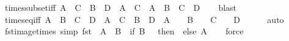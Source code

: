 \begin{isabellebody}
\isamarkupfalse%
\ times{\isacharunderscore}{\kern0pt}subset{\isacharunderscore}{\kern0pt}iff{\isacharcolon}{\kern0pt}\ {\isachardoublequoteopen}A\ {\isasymtimes}\ C\ {\isasymsubseteq}\ B\ {\isasymtimes}\ D\ {\isasymlongleftrightarrow}\ A{\isacharequal}{\kern0pt}{\isacharbraceleft}{\kern0pt}{\isacharbraceright}{\kern0pt}\ {\isasymor}\ C{\isacharequal}{\kern0pt}{\isacharbraceleft}{\kern0pt}{\isacharbraceright}{\kern0pt}\ {\isasymor}\ A\ {\isasymsubseteq}\ B\ {\isasymand}\ C\ {\isasymsubseteq}\ D{\isachardoublequoteclose}\isanewline
%
\isadelimproof
\ \ %
\endisadelimproof
%
\isatagproof
{}\isamarkupfalse%
\ blast%
\endisatagproof
{\isafoldproof}%
%
\isadelimproof
\isanewline
%
\endisadelimproof
\isanewline
{}\isamarkupfalse%
\ times{\isacharunderscore}{\kern0pt}eq{\isacharunderscore}{\kern0pt}iff{\isacharcolon}{\kern0pt}\ {\isachardoublequoteopen}A\ {\isasymtimes}\ B\ {\isacharequal}{\kern0pt}\ C\ {\isasymtimes}\ D\ {\isasymlongleftrightarrow}\ A\ {\isacharequal}{\kern0pt}\ C\ {\isasymand}\ B\ {\isacharequal}{\kern0pt}\ D\ {\isasymor}\ {\isacharparenleft}{\kern0pt}A\ {\isacharequal}{\kern0pt}\ {\isacharbraceleft}{\kern0pt}{\isacharbraceright}{\kern0pt}\ {\isasymor}\ B\ {\isacharequal}{\kern0pt}\ {\isacharbraceleft}{\kern0pt}{\isacharbraceright}{\kern0pt}{\isacharparenright}{\kern0pt}\ {\isasymand}\ {\isacharparenleft}{\kern0pt}C\ {\isacharequal}{\kern0pt}\ {\isacharbraceleft}{\kern0pt}{\isacharbraceright}{\kern0pt}\ {\isasymor}\ D\ {\isacharequal}{\kern0pt}\ {\isacharbraceleft}{\kern0pt}{\isacharbraceright}{\kern0pt}{\isacharparenright}{\kern0pt}{\isachardoublequoteclose}\isanewline
%
\isadelimproof
\ \ %
\endisadelimproof
%
\isatagproof
{}\isamarkupfalse%
\ auto%
\endisatagproof
{\isafoldproof}%
%
\isadelimproof
\isanewline
%
\endisadelimproof
\isanewline
{}\isamarkupfalse%
\ fst{\isacharunderscore}{\kern0pt}image{\isacharunderscore}{\kern0pt}times\ {\isacharbrackleft}{\kern0pt}simp{\isacharbrackright}{\kern0pt}{\isacharcolon}{\kern0pt}\ {\isachardoublequoteopen}fst\ {\isacharbackquote}{\kern0pt}\ {\isacharparenleft}{\kern0pt}A\ {\isasymtimes}\ B{\isacharparenright}{\kern0pt}\ {\isacharequal}{\kern0pt}\ {\isacharparenleft}{\kern0pt}if\ B\ {\isacharequal}{\kern0pt}\ {\isacharbraceleft}{\kern0pt}{\isacharbraceright}{\kern0pt}\ then\ {\isacharbraceleft}{\kern0pt}{\isacharbraceright}{\kern0pt}\ else\ A{\isacharparenright}{\kern0pt}{\isachardoublequoteclose}\isanewline
%
\isadelimproof
\ \ %
\endisadelimproof
%
\isatagproof
{}\isamarkupfalse%
\ force%
\endisatagproof
{\isafoldproof}%

\end{isabellebody}
